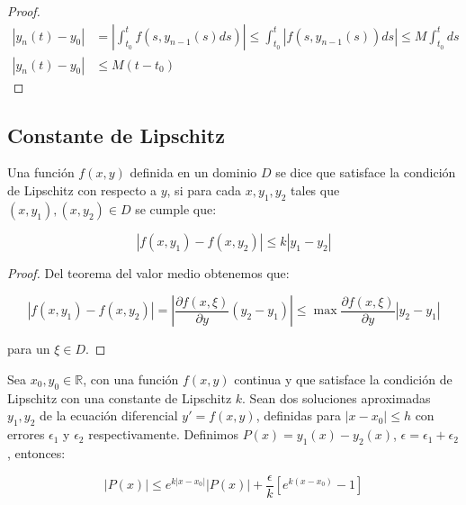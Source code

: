 
		\begin{proof}
			\begin{align*}
				|y_n(t) - y_0| &= \left| \int_{t_0}^t f(s, y_{n-1}(s) ds) \right| \leq \int_{t_0}^t \left| f(s, y_{n-1}(s)) ds \right| \leq M \int_{t_0}^t ds \\
				|y_n(t) - y_0| &\leq M(t - t_0)
			\end{align*}
		\end{proof}

	\newpage
	\subsection{Constante de Lipschitz}

		\begin{definicion}
			Una función $f(x, y)$ definida en un dominio $D$ se dice que satisface la condición de Lipschitz con respecto a $y$, si para cada $x, y_1, y_2$ tales que $(x, y_1), (x, y_2) \in D$ se cumple que:

			\begin{equation}
				|f(x, y_1) - f(x, y_2)| \leq k |y_1 - y_2|
			\end{equation}
		\end{definicion}

		\begin{proof}
			Del teorema del valor medio obtenemos que:

			\begin{equation}
				|f(x, y_1) - f(x, y_2)| = \left| \frac{\partial f(x, \xi)}{\partial y} (y_2 - y_1) \right| \leq \max{\frac{\partial f(x, \xi)}{\partial y} |y_2 - y_1|}
			\end{equation}

			para un $\xi \in D$.
		\end{proof}

		\begin{teorema}
			Sea $x_0, y_0 \in \mathbb{R}$, con una función $f(x, y)$ continua y que satisface la condición de Lipschitz con una constante de Lipschitz $k$.
			Sean dos soluciones aproximadas $y_1, y_2$ de la ecuación diferencial $y' = f(x, y)$, definidas para $|x - x_0| \leq h$ con errores $\epsilon_1$ y $\epsilon_2$ respectivamente.
			Definimos $P(x) = y_1(x) - y_2(x)$, $\epsilon = \epsilon_1 + \epsilon_2$, entonces:

			\begin{equation}
				\left| P(x) \right| \leq e^{k|x - x_0|} \left| P(x) \right| + \frac{\epsilon}{k} \left[ e^{k(x - x_0)} - 1 \right]
			\end{equation}
		\end{teorema}

